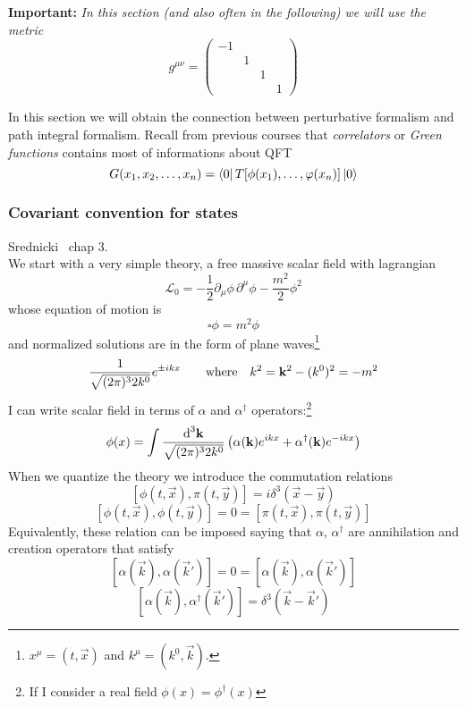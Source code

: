 \documentclass[../main/main.tex]{subfiles}
\begin{document}
\textbf{Important:} \textit{In this section (and also often in the following) we will use the metric}
\[g^{\mu\nu}=\begin{pmatrix}-1&&&\\&1&&\\&&1&\\&&&1\end{pmatrix}\]


In this section we will obtain the connection between perturbative formalism and path integral formalism.
Recall from previous courses that \emph{correlators} or \emph{Green functions} contains most of informations about QFT
\[G(x_1,x_2,\dots,x_n)=\bra0T[\phi(x_1),\dots,\varphi(x_n)]\ket0\]

\subsubsection{Covariant convention for states}
\textsf{Srednicki~\cite{Srednicki:2007aa} chap 3}.\\

We start with a very simple theory, a free massive scalar field with lagrangian
\[\mathcal L_0=-\frac12\partial_\mu\phi\,\partial^\mu\phi-\frac{m^2}2\phi^2\]
whose  equation of motion is 
\[\square\phi=m^2\phi\]
and normalized solutions are in the form of plane waves\footnote{$x^\mu=(t,\vec x)$ and $k^\mu=(k^0,\vec k)$.}
\[ \frac1{\sqrt{(2\pi)^32k^0}}e^{\pm ik x}\qquad\textup{where}\quad k^2=\vec k^2-(k^0)^2=-m^2\]
I can write scalar field in terms of $\alpha$ and $\alpha^\dagger$ operators:\footnote{If I consider a real field $\phi(x)=\phi^\dagger(x)$}
\begin{equation}\label{eq:scalar-phi-expansion}\phi(x)=\int\frac{\de^3\vec k}{\sqrt{(2\pi)^32k^0}}\left(\alpha(\vec k)e^{ikx}+\alpha^\dagger(\vec k)e^{-ikx}\right)\end{equation}
When we quantize the theory we introduce the commutation relations
\[[\phi(t,\vec x),\pi(t,\vec y)]=i\delta^3(\vec x-\vec y)\]
\[[\phi(t,\vec x),\phi(t,\vec y)]=0=[\pi(t,\vec x),\pi(t,\vec y)]\]
Equivalently, these relation can be imposed saying that $\alpha$, $\alpha^\dagger$ are annihilation and creation operators that satisfy
\[[\alpha(\vec k),\alpha(\vec k')]=0=[\alpha(\vec k),\alpha(\vec k')]\]
\[[\alpha(\vec k), \alpha^\dagger(\vec k')]=\delta^3(\vec k-\vec k')\]
\end{document}
